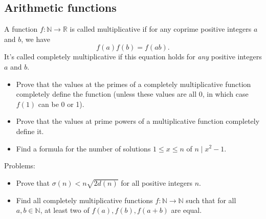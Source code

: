 \subsection{Arithmetic functions}
A function $f:\mathbb N\to\mathbb R$ is called multiplicative if for any
coprime positive integers $a$ and $b$, we have
\[f(a)f(b)=f(ab).\]
It's called completely multiplicative if this equation holds for \emph{any}
positive integers $a$ and $b$.
\begin{itemize}
\item Prove that the values at the primes of a completely multiplicative
  function completely define the function (unless these values are all 0, in
  which case $f(1)$ can be 0 or 1).
\item Prove that the values at prime powers of a multiplicative function
  completely define it. 
\item Find a formula for the number of solutions $1\le x\le n$ of $n\mid x^2-1$.
\end{itemize}
Problems:
\begin{itemize}
    \item Prove that $\sigma(n)<n\sqrt{2d(n)}$ for all positive integers $n$.
    \item Find all completely multiplicative functions $f:\mathbb N\to\mathbb N$
    such that for all $a,b\in\mathbb N$, at least two of $f(a),f(b),f(a+b)$ are
    equal.
\end{itemize}

